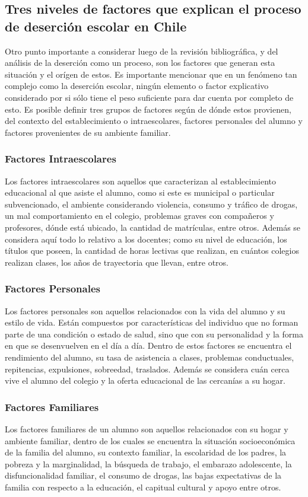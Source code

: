 \subsection{Tres niveles de factores que explican el proceso de deserción escolar en Chile}
Otro punto importante a considerar luego de la revisión bibliográfica, y del análisis de la deserción como un proceso, son los factores que generan esta situación y el orígen de estos. Es importante mencionar que en un fenómeno tan complejo como la deserción escolar, ningún elemento o factor explicativo considerado por si sólo tiene el peso suficiente para dar cuenta por completo de esto. 
Es posible definir tres grupos de factores según de dónde estos provienen, del contexto del establecimiento o intraescolares, factores personales del alumno y factores provenientes de su ambiente familiar. 
\subsubsection{Factores Intraescolares}
Los factores intraescolares son aquellos que caracterizan al establecimiento educacional al que asiste el alumno, como si este es municipal o particular subvencionado, el ambiente considerando violencia, consumo y tráfico de drogas, un mal comportamiento en el colegio, problemas graves con compañeros y profesores, dónde está ubicado, la cantidad de matrículas, entre otros.  Además se considera aquí todo lo relativo a los docentes; como su nivel de educación, los títulos que poseen, la cantidad de horas lectivas que realizan, en cuántos colegios realizan clases, los años de trayectoria que llevan, entre otros. 
\subsubsection{Factores Personales}
Los factores personales son aquellos relacionados con la vida del alumno y su estilo de vida. Están compuestos por características del individuo que no forman parte de una condición o estado de salud, sino que con su personalidad y la forma en que se desenvuelven en el día a día. 
Dentro de estos factores se encuentra el rendimiento del alumno, su tasa de asistencia a clases, problemas conductuales, repitencias, expulsiones, sobreedad, traslados. Además se considera cuán cerca vive el alumno del colegio y la oferta educacional de las cercanías a su hogar. 
\subsubsection{Factores Familiares}
Los factores familiares de un alumno son aquellos relacionados con su hogar y ambiente familiar, dentro de los cuales se encuentra la situación socioeconómica de la familia del alumno, su contexto familiar, la escolaridad de los padres, la pobreza y la marginalidad, la búsqueda de trabajo, el embarazo adolescente, la disfuncionalidad familiar, el consumo de drogas, las bajas expectativas de la familia con respecto a la educación, el capitual cultural y apoyo entre otros.

